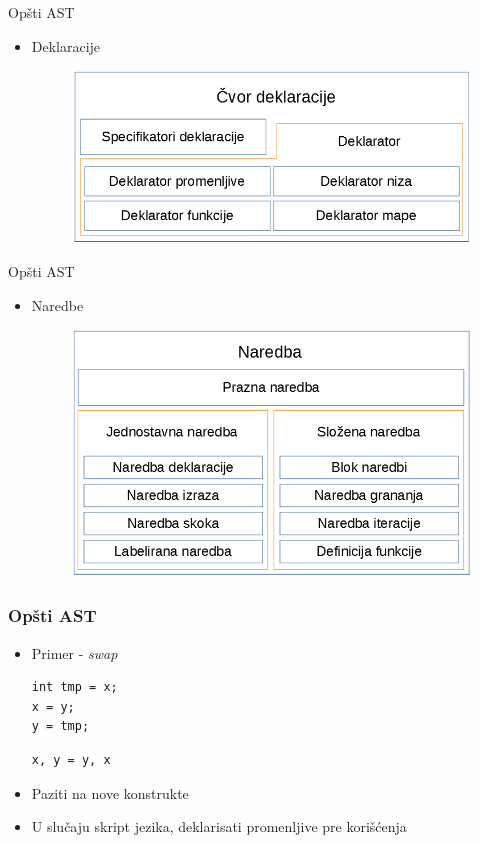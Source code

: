 \documentclass{beamer}
\begin{document}
\begin{frame}{Op\v{s}ti AST}
    \begin{itemize}
        \item Deklaracije
        \begin{figure}[h!]
            \centering
            \includegraphics[scale=0.5]{images/declaration_nodes.png}
        \end{figure}
    \end{itemize}
\end{frame}

\begin{frame}{Op\v{s}ti AST}
    \begin{itemize}
        \item Naredbe
        \begin{figure}[h!]
            \centering
            \includegraphics[scale=0.5]{images/statement_nodes.png}
        \end{figure}
    \end{itemize}
\end{frame}

\begin{frame}[fragile]
\frametitle{Op\v{s}ti AST}
    \begin{itemize}
        \item Primer - \emph{swap}
\begin{lstlisting}
int tmp = x;
x = y;
y = tmp;
\end{lstlisting}
\begin{lstlisting}
x, y = y, x
\end{lstlisting}
        \item Paziti na nove konstrukte
        \item U slu\v{c}aju skript jezika, deklarisati promenljive pre kori\v{s}\'c{}enja
    \end{itemize}
\end{frame}
\end{document}
